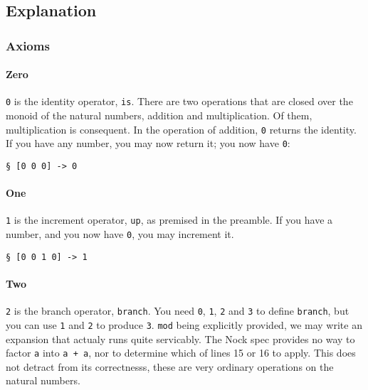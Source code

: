 \documentclass[twoside]{article}
\begin{document}
\subsection{Explanation}

\subsubsection{Axioms}

\paragraph{Zero}

\texttt{0} is the identity operator, \texttt{is}. There are two operations that are closed over the monoid of the natural numbers, addition and multiplication. Of them, multiplication is consequent. In the operation of addition, \texttt{0} returns the identity. If you have any number, you may now return it; you now have \texttt{0}:

\begin{lstlisting}[style=listingcode]
§ [0 0 0] -> 0
\end{lstlisting}

\paragraph{One}

\texttt{1} is the increment operator, \texttt{up}, as premised in the preamble. If you have a number, and you now have \texttt{0}, you may increment it. 

\begin{lstlisting}[style=listingcode]
§ [0 0 1 0] -> 1
\end{lstlisting}

\paragraph{Two}

\texttt{2} is the branch operator, \texttt{branch}. You need \texttt{0}, \texttt{1}, \texttt{2} and \texttt{3} to define \texttt{branch}, but you can use \texttt{1} and \texttt{2} to produce \texttt{3}. \texttt{mod} being explicitly provided, we may write an expansion that actualy runs quite servicably. The Nock spec provides no way to factor \texttt{a} into \texttt{a + a}, nor to determine which of lines 15 or 16 to apply. This does not detract from its correctnesss, these are very ordinary operations on the natural numbers.
\end{document}
